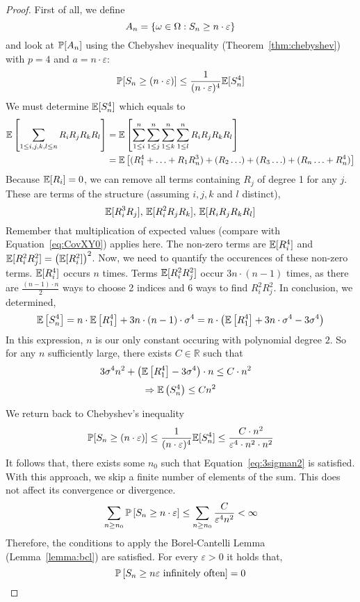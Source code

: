 \begin{proof}
  First of all, we define
  \[ A_n = \left\{\omega \in \Omega: S_n \geq n \cdot \varepsilon\right\} \]
  and look at $\mathbb P[A_n]$ using the Chebyshev inequality (Theorem~\ref{thm:chebyshev}) with $p=4$ and $a=n\cdot\varepsilon$:
  \[ \mathbb P[S_n \geq (n\cdot\varepsilon)] \leq \frac{1}{(n\cdot\varepsilon)^4} \mathbb E[S_n^4] \]
  We must determine $\mathbb E[S_n^4]$ which equals to
  \begin{align*}
    \mathbb E\left[\sum_{1 \leq i,j,k,l \leq n} R_i R_j R_k R_l\right]
      &= \mathbb E\left[\sum_{1\leq i}^n \sum_{1\leq j}^n \sum_{1\leq k}^n \sum_{1\leq l}^n R_i R_j R_k R_l\right] \notag\\
      &= \mathbb E\left[(R_1^4 + \ldots + R_1 R_n^3) + (R_2 \ldots) + (R_3 \ldots) + (R_n \ldots + R_n^4) \right]
  \end{align*}
  Because $\mathbb E[R_i] = 0$, we can remove all terms containing $R_j$ of degree 1 for any $j$.
  These are terms of the structure (assuming $i, j, k$ and $l$ distinct),
  \[
    \mathbb E[R_i^3 R_j], \,
    \mathbb E[R_i^2 R_j R_k], \,
    \mathbb E[R_i R_j R_k R_l]
  \]
  Remember that multiplication of expected values (compare with Equation~\ref{eq:CovXY0}) applies here.
  The non-zero terms are $\mathbb E[R_i^4]$ and $\mathbb E[R_i^2 R_j^2] = \left(\mathbb E[R_i^2]\right)^2$.
  Now, we need to quantify the occurences of these non-zero terms. $\mathbb E[R_i^4]$ occurs $n$ times.
  Terms $\mathbb E[R_i^2 R_j^2]$ occur $3n \cdot (n-1)$ times, as there are $\frac{(n-1) \cdot n}{2}$ ways to choose 2 indices and 6 ways to find $R_i^2 R_j^2$.
  In conclusion, we determined,
  \[
    \mathbb E\left[S_n^4\right]
      = n \cdot \mathbb E\left[R_1^4\right] + 3n \cdot (n - 1) \cdot \sigma^4
      = n \cdot \left( \mathbb E\left[R_1^4\right] + 3n \cdot \sigma^4 - 3 \sigma^4 \right)
  \]
  In this expression, $n$ is our only constant occuring with polynomial degree $2$. So for any $n$ sufficiently large, there exists $C \in \mathbb R$ such that
  \begin{align}
    3 \sigma^4 n^2 + \left(\mathbb E\left[R_1^4\right] - 3 \sigma^4\right) \cdot n &\leq C \cdot n^2 \label{eq:3sigman2}
  \end{align}
  \[ \Rightarrow \mathbb E\left(S_n^4\right) \leq C n^2 \]

  We return back to Chebyshev's inequality
  \[
      \mathbb P[S_n \geq (n\cdot\varepsilon)]
      \leq \frac{1}{(n\cdot\varepsilon)^4} \mathbb E[S_n^4]
      \leq \frac{C \cdot n^2}{\varepsilon^4 \cdot n^2 \cdot n^2}
  \]
  It follows that, there exists some $n_0$ such that Equation~\eqref{eq:3sigman2} is satisfied.
  With this approach, we skip a finite number of elements of the sum. This does not affect its convergence or divergence.
  \[
      \sum_{n \geq n_0} \mathbb P\left[S_n \geq n \cdot \varepsilon\right]
      \leq \sum_{n \geq n_0} \frac{C}{\varepsilon^4 n^2} < \infty
  \]
  Therefore, the conditions to apply the Borel-Cantelli Lemma (Lemma~\ref{lemma:bcl}) are satisfied.
  For every $\varepsilon > 0$ it holds that,
  \[ \mathbb P\left[S_n \geq n \varepsilon \text{ infinitely often}\right] = 0 \]
\end{proof}

